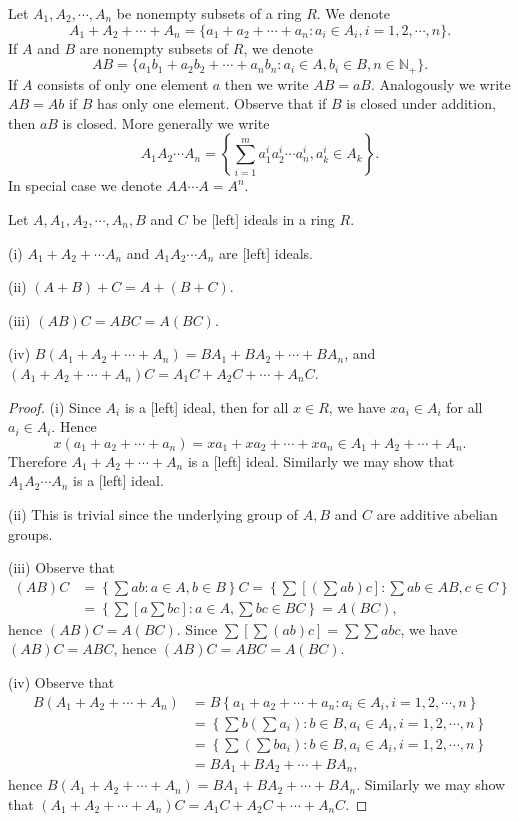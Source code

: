 Let $A_1,A_2,\cdots,A_n$ be nonempty subsets of a ring $R$. We denote 
$$A_1+A_2+\cdots+A_n=\{a_1+a_2+\cdots+a_n:a_i\in A_i,i=1,2,\cdots,n\}.$$
If $A$ and $B$ are nonempty subsets of $R$, we denote 
$$AB=\{a_1b_1+a_2b_2+\cdots+a_nb_n:a_i\in A,b_i\in B,n\in\mathbb{N}_+\}.$$
If $A$ consists of only one element $a$ then we write $AB=aB$. Analogously we write $AB=Ab$ if $B$ has only one element. Observe that if $B$ is closed under addition, then $aB$ is closed. More generally we write 
$$A_1A_2\cdots A_n=\left\{\sum_{i=1}^ma_1^ia_2^i\cdots a_n^i,a_k^i\in A_k\right\}.$$
In special case we denote $AA\cdots A=A^n$.
\begin{theorem}
Let $A,A_1,A_2,\cdots,A_n,B$ and $C$ be [left] ideals in a ring $R$.\par
(i) $A_1+A_2+\cdots A_n$ and $A_1A_2\cdots A_n$ are [left] ideals.\par
(ii) $(A+B)+C=A+(B+C)$.\par
(iii) $(AB)C=ABC=A(BC)$.\par
(iv) $B(A_1+A_2+\cdots+A_n)=BA_1+BA_2+\cdots+BA_n$, and $(A_1+A_2+\cdots+A_n)C=A_1C+A_2C+\cdots+A_nC$.
\end{theorem}
\begin{proof}
(i) Since $A_i$ is a [left] ideal, then for all $x\in R$, we have $xa_i\in A_i$ for all $a_i\in A_i$. Hence 
$$
x\left( a_1+a_2+\cdots +a_n \right) =xa_1+xa_2+\cdots +xa_n\in A_1+A_2+\cdots +A_n.
$$
Therefore $A_1+A_2+\cdots+A_n$ is a [left] ideal. Similarly we may show that $A_1A_2\cdots A_n$ is a [left] ideal.\par
(ii) This is trivial since the underlying group of $A,B$ and $C$ are additive abelian groups.\par
(iii) Observe that 
$$
\begin{aligned}
\left( AB \right) C&=\left\{ \sum{ab}:a\in A,b\in B \right\} C=\left\{ \sum{\left[ \left( \sum{ab} \right) c \right]}:\sum{ab}\in AB,c\in C \right\} \\
&=\left\{ \sum{\left[ a\sum{bc} \right] :a\in A,\sum{bc}\in BC} \right\} =A\left( BC \right) ,
\end{aligned}
$$
hence $(AB)C=A(BC)$. Since $\sum\left[\sum(ab)c\right]=\sum\sum abc$, we have $(AB)C=ABC$, hence $(AB)C=ABC=A(BC)$.\par
(iv) Observe that 
$$
\begin{aligned}
B\left( A_1+A_2+\cdots +A_n \right) 
&=B\left\{ a_1+a_2+\cdots +a_n:a_i\in A_i,i=1,2,\cdots ,n \right\} 
\\
&=\left\{ \sum{b\left( \sum{a_i} \right)}:b\in B,a_i\in A_i,i=1,2,\cdots ,n \right\} 
\\
&=\left\{ \sum{\left( \sum{ba_i} \right)}:b\in B,a_i\in A_i,i=1,2,\cdots ,n \right\} 
\\
&=BA_1+BA_2+\cdots +BA_n,
\end{aligned}
$$
hence $B(A_1+A_2+\cdots+A_n)=BA_1+BA_2+\cdots+BA_n$. Similarly we may show that $(A_1+A_2+\cdots+A_n)C=A_1C+A_2C+\cdots+A_nC$.
\end{proof}
